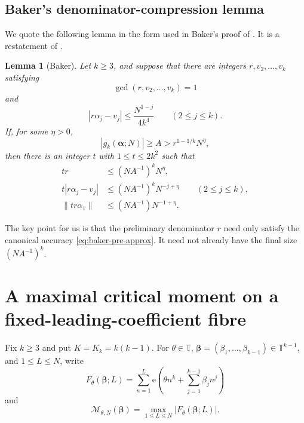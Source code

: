 \documentclass[11pt,reqno]{amsart}
\numberwithin{equation}{section}
\newtheorem{lemma}[lemma]{Lemma}
\theoremstyle{definition}
\theoremstyle{remark}
\newcommand{\T}{\mathbb T}
\newcommand{\e}{\mathrm e}
\newcommand{\cM}{\mathcal M}
\begin{document}
\subsection{Baker's denominator-compression lemma}

We quote the following lemma in the form used in Baker's proof of \cite[Theorem~4]{Baker2016}.  It is a restatement of \cite[Lemma~4.6]{Baker1986}.

\begin{lemma}[Baker]\label{lem:baker-compression}
Let $k\ge3$, and suppose that there are integers $r,v_2,\ldots,v_k$ satisfying
\[
  \gcd(r,v_2,\ldots,v_k)=1
\]
and
\begin{equation}\label{eq:baker-pre-approx}
  |r\alpha_j-v_j|
  \le \frac{N^{1-j}}{4k^4}
  \qquad(2\le j\le k).
\end{equation}
If, for some $\eta>0$,
\begin{equation}\label{eq:baker-amplitude}
  |g_k(\boldsymbol\alpha;N)|\ge A
  >r^{1-1/k}N^\eta,
\end{equation}
then there is an integer $t$ with $1\le t\le2k^2$ such that
\begin{align}
  tr&\le (NA^{-1})^kN^\eta,\label{eq:baker-compressed-q}\\
  t|r\alpha_j-v_j|
  &\le (NA^{-1})^kN^{-j+\eta}
  \qquad(2\le j\le k),\label{eq:baker-compressed-high}\\
  \|tr\alpha_1\|
  &\le (NA^{-1})N^{-1+\eta}.
  \label{eq:baker-compressed-linear}
\end{align}
\end{lemma}

The key point for us is that the preliminary denominator $r$ need only satisfy the canonical accuracy \eqref{eq:baker-pre-approx}.  It need not already have the final size $(NA^{-1})^k$.

\section{A maximal critical moment on a fixed-leading-coefficient fibre}

Fix $k\ge3$ and put $K=K_k=k(k-1)$.  For $\theta\in\T$, $\boldsymbol\beta=(\beta_1,\ldots,\beta_{k-1})\in\T^{k-1}$, and $1\le L\le N$, write
\begin{equation}\label{eq:fibre-sum}
  F_{\theta}(\boldsymbol\beta;L)
  =\sum_{n=1}^{L}
  \e\left(\theta n^k+\sum_{j=1}^{k-1}\beta_jn^j\right)
\end{equation}
and
\begin{equation}\label{eq:maximal-fibre-sum}
  \cM_{\theta,N}(\boldsymbol\beta)
  =\max_{1\le L\le N}
  |F_{\theta}(\boldsymbol\beta;L)|.
\end{equation}
\end{document}
